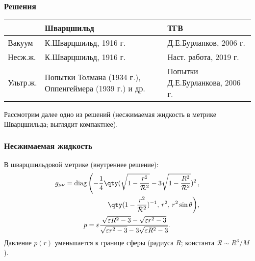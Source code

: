 \documentclass[compress]{beamer}
\begin{document}
    \begin{frame}\frametitle{Решения}

        {\footnotesize{
        \begin{tabular}{|m{4em}|m{13em}|m{13em}|}\hline
            {} & Шварцшильд & ТГВ \\\hline\hline
            Вакуум & К.Шварцшильд, 1916 г. \cite{schwarzschild_free_space_rus} & Д.Е.Бурланков, 2006 г. \cite{burlankov_space_dynamics,burlankov_new_phys} \\\hline
            Несж.ж. & К.Шварцшильд, 1916 г. \cite{schwarzschild_fluid} & Наст. работа\footnotemark{}, 2019 г. \\\hline
            Ультр.ж. & Попытки Толмана (1934 г.), Оппенгеймера (1939 г.) и др. \cite{tolman,oppenheimer_volkoff,oppenheimer_snyder} & Попытки Д.Е.Бурланкова, 2006 г. \cite{burlankov_space_dynamics,burlankov_new_phys} \\\hline
        \end{tabular}
        }}


        \vfill

        Рассмотрим далее одно из решений (несжимаемая жидкость в метрике Шварцшильда; выглядит компактнее).

    \end{frame}


    \begin{frame}\frametitle{Несжимаемая жидкость}

        В шварцшильдовой метрике (внутреннее решение):
        \begin{gather}
            \begin{aligned}
                g_{\mu\nu} = \text{diag} \left(
                    - \frac{1}{4} \qty(\sqrt{1 - \frac{r^2}{\mathcal{R}^2}} - 3 \sqrt{1 - \frac{R^2}{\mathcal{R}^2}})^2\right.&, \\
                    \left.\qty(1 - \frac{r^2}{\mathcal{R}^2})^{-1},\,
                    r^2,\,
                    r^2 \sin\theta
                \right)& ,
            \end{aligned}\\
            p = \varepsilon \frac{\sqrt{\varepsilon R^2 - 3} - \sqrt{\varepsilon r^2 - 3}}{
                \sqrt{\varepsilon r^2 - 3} - 3 \sqrt{\varepsilon R^2 - 3}
            } .
        \end{gather}
        Давление $p(r)$ уменьшается к границе сферы (радиуса $R$; константа $\mathcal{R}\sim R^3/M$).

    \end{frame}
\end{document}
